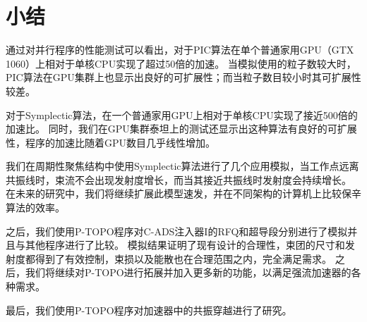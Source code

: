 \section{小结}                    \label{section:Simulation_conclusion}
通过对并行程序的性能测试可以看出，对于PIC算法在单个普通家用GPU（GTX 1060）上相对于单核CPU实现了超过50倍的加速。
当模拟使用的粒子数较大时，PIC算法在GPU集群上也显示出良好的可扩展性；而当粒子数目较小时其可扩展性较差。

对于Symplectic算法，在一个普通家用GPU上相对于单核CPU实现了接近500倍的加速比。
同时，我们在GPU集群泰坦上的测试还显示出这种算法有良好的可扩展性，程序的加速比随着GPU数目几乎线性增加。

我们在周期性聚焦结构中使用Symplectic算法进行了几个应用模拟，当工作点远离共振线时，束流不会出现发射度增长，而当其接近共振线时发射度会持续增长。
在未来的研究中，我们将继续扩展此模型速发，并在不同架构的计算机上比较保辛算法的效率。

之后，我们使用P-TOPO程序对C-ADS注入器I的RFQ和超导段分别进行了模拟并且与其他程序进行了比较。
模拟结果证明了现有设计的合理性，束团的尺寸和发射度都得到了有效控制，束损以及能散也在合理范围之内，完全满足需求。
之后，我们将继续对P-TOPO进行拓展并加入更多新的功能，以满足强流加速器的各种需求。

最后，我们使用P-TOPO程序对加速器中的共振穿越进行了研究。